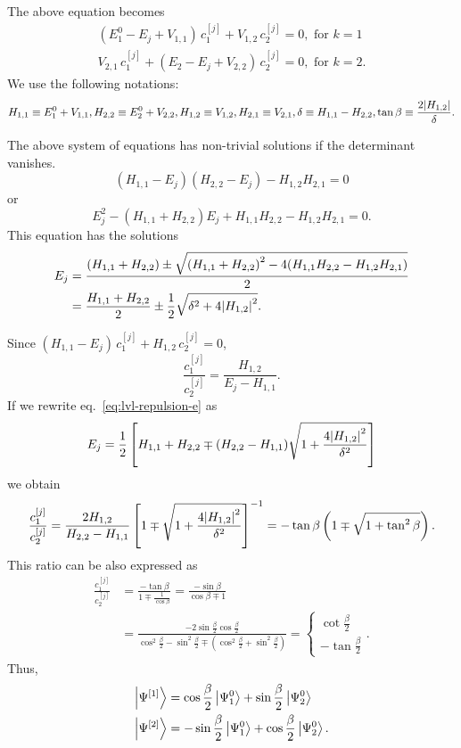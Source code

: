 \documentclass[../thesis.tex]{subfiles}
\theoremstyle{definition}
\begin{document}
The above equation becomes
\begin{align*}
  (E_1^0 - E_j + V_{1,1})\, c_1^{[j]} + V_{1,2}\, c_2^{[j]} = 0, \text{ for } k=1 \\
  V_{2,1}\, c_1^{[j]} + (E_2 - E_j + V_{2,2})\, c_2^{[j]} = 0, \text{ for } k=2.
\end{align*}
We use the following notations:
\[
  H_{1,1} \equiv E_1^0 + V_{1,1}, H_{2,2} \equiv E_2^0 + V_{2,2}, H_{1,2} \equiv V_{1,2},
  H_{2,1} \equiv V_{2,1}, \delta \equiv H_{1,1} - H_{2,2}, \tan{\beta} \equiv \frac{2\abs{H_{1,2}}}{\delta}.
\]

The above system of equations has non-trivial solutions if the determinant vanishes.
\[
  (H_{1,1} - E_j)(H_{2,2} - E_j) - H_{1,2} H_{2,1} = 0
\]
or
\[
  E_j^2 - (H_{1,1} + H_{2,2}) E_j + H_{1,1} H_{2,2} - H_{1,2} H_{2,1} = 0.
\]
This equation has the solutions
\begin{align}
  E_j &= \frac{(H_{1,1} + H_{2,2}) \pm
         \sqrt{ {(H_{1,1} + H_{2,2})}^2 - 4(H_{1,1} H_{2,2} - H_{1,2} H_{2,1})}}{2} \\
      &= \frac{H_{1,1} + H_{2,2}}{2} \pm \frac{1}{2} \sqrt{\delta^2 + 4 \abs{H_{1,2}}^2}.
\label{eq:lvl-repulsion-e}
\end{align}

Since \((H_{1,1} - E_j)\, c_1^{[j]} + H_{1,2}\, c_2^{[j]} = 0\),
\[
  \frac{c_1^{[j]}}{c_2^{[j]}} = \frac{H_{1,2}}{E_j - H_{1,1}}.
\]
If we rewrite eq.~\eqref{eq:lvl-repulsion-e} as
\[
  E_j = \frac{1}{2} \left[ H_{1,1} + H_{2,2} \mp (H_{2,2} - H_{1,1})
        \sqrt{1 + \frac{4\abs{H_{1,2}}^2}{\delta^2}}\right]
\]
we obtain
\[
  \frac{c_1^{[j]}}{c_2^{[j]}} = \frac{2 H_{1,2}}{H_{2,2} - H_{1,1}}
  \left[ 1 \mp \sqrt{1 + \frac{4\abs{H_{1,2}}^2}{\delta^2}} \right]^{-1}
  = -\tan{\beta}\left(1 \mp \sqrt{1+\tan^2\beta}\right).
\]
This ratio can be also expressed as
\begin{align*}
  \frac{c_1^{[j]}}{c_2^{[j]}} &= \frac{-\tan{\beta}}{1 \mp \frac{1}{\cos{\beta}}}
  = \frac{-\sin{\beta}}{\cos{\beta} \mp 1} \\
  &= \frac{-2\sin{\frac{\beta}{2}} \cos{\frac{\beta}{2}}}
      {\cos^2{\frac{\beta}{2}} - \sin^2{\frac{\beta}{2}} \mp
        \left(\cos^2{\frac{\beta}{2}} + \sin^2{\frac{\beta}{2}}\right)}
  =
  \begin{cases}
    \cot{\frac{\beta}{2}} \\
    -\tan{\frac{\beta}{2}}
  \end{cases}.
\end{align*}
Thus,
\begin{align*}
  \ket{\Psi^{[1]}} &= \cos{\frac{\beta}{2}} \ket{\Psi_1^0} + \sin{\frac{\beta}{2}} \ket{\Psi_2^0} \\
  \ket{\Psi^{[2]}} &= -\sin{\frac{\beta}{2}} \ket{\Psi_1^0} + \cos{\frac{\beta}{2}} \ket{\Psi_2^0}.
\end{align*}
\end{document}
